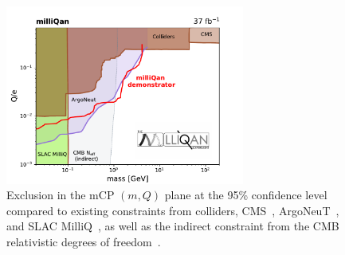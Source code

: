 \begin{figure}[t]
  \begin{center}
    \includegraphics[width=0.70\textwidth]{figs/milliq/finalLimit.pdf}
    \caption{Exclusion in the mCP $(m,Q)$ plane at the 95\% confidence level compared
      to existing constraints from colliders, CMS~\cite{Chatrchyan_2013,Chatrchyan_2013_2}, ArgoNeuT~\cite{ArgoNeuT}, and SLAC MilliQ~\cite{MilliQ},
      as well as the indirect constraint from the CMB relativistic degrees of freedom~\cite{Brust:2013ova}.
            }
    \label{fig:mq_limit}
  \end{center}
\end{figure}
